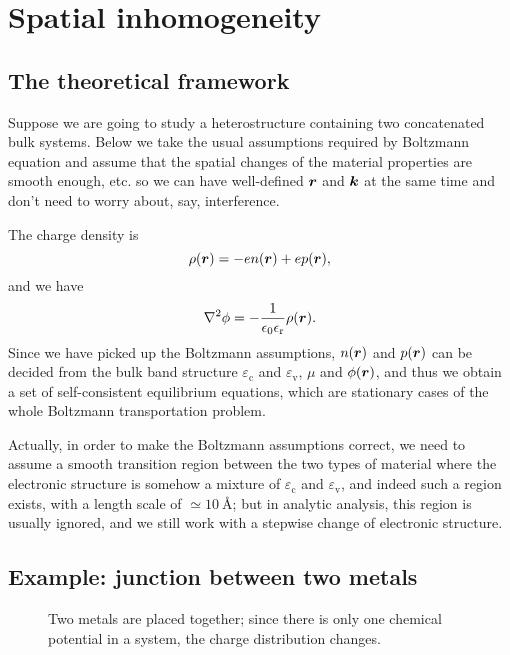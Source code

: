 \documentclass[hyperref, a4paper]{article}
\newcommand{\epsr}{\epsilon_{\text{r}}}
\begin{document}
\section{Spatial inhomogeneity}

\subsection{The theoretical framework}

Suppose we are going to study a heterostructure
containing two concatenated bulk systems.
Below we take the usual assumptions required by Boltzmann equation 
and assume that the spatial changes 
of the material properties are smooth enough, etc. 
so we can have well-defined $\vb*{r}$ and $\vb*{k}$
at the same time and don't need to worry about, say, interference.

The charge density is 
\begin{equation}
    \rho(\vb*{r}) = - e n (\vb*{r}) + e p (\vb*{r}),
\end{equation}
and we have 
\begin{equation}
    \laplacian \phi = - \frac{1}{\epsilon_0 \epsr} \rho(\vb*{r}).
\end{equation}
Since we have picked up the Boltzmann assumptions, 
$n(\vb*{r})$ and $p(\vb*{r})$
can be decided from the bulk band structure 
$\varepsilon_{\text{c}}$ and $\varepsilon_{\text{v}}$, 
$\mu$ and $\phi(\vb*{r})$,
and thus we obtain a set of self-consistent equilibrium equations,
which are stationary cases 
of the whole Boltzmann transportation problem.

Actually, in order to make the Boltzmann assumptions correct, 
we need to assume a smooth transition region 
between the two types of material
where the electronic structure is somehow a mixture 
of $\varepsilon_{\text{c}}$ and $\varepsilon_{\text{v}}$,
and indeed such a region exists,
with a length scale of $\simeq \SI{10}{\angstrom}$;
but in analytic analysis, 
this region is usually ignored, 
and we still work with a stepwise change of electronic structure.

\subsection{Example: junction between two metals}

\begin{figure}
    \centering
    
    \caption{Two metals are placed together; 
    since there is only one chemical potential in a system, 
    the charge distribution changes.}
    \label{fig:two-metal}
\end{figure}
\end{document}
